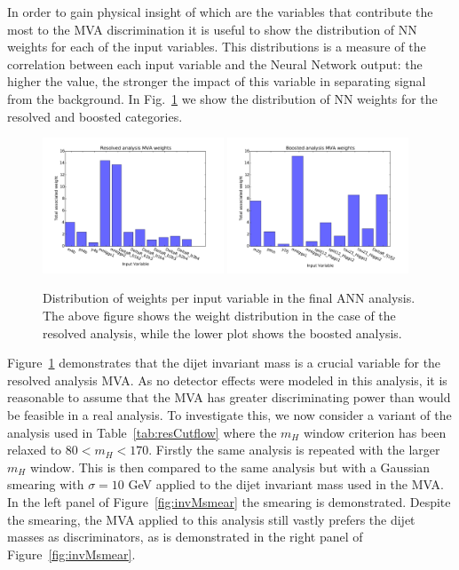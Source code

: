 In order to gain physical insight of which are the variables that
contribute the most to the MVA discrimination it is useful
to show the distribution of NN weights for each of the
input variables.
%
This distributions is a measure of the correlation between
each input variable and the Neural Network output: the higher
the value, the stronger the impact of this variable in
separating signal from the background.
%
In Fig.~\ref{fig:nnweights} we show
the distribution of NN weights for the resolved and boosted categories.

\begin{figure}[t]
\begin{center}
\includegraphics[width=0.48\textwidth]{plots/nnweights_res.pdf}
\includegraphics[width=0.48\textwidth]{plots/nnweights_boost.pdf}
\caption{\small Distribution of weights per input variable in the final ANN analysis. The above figure shows the weight distribution in the case of the resolved analysis, while the lower plot shows the boosted analysis.}
\label{fig:nnweights}
\end{center}
\end{figure}
\clearpage

Figure~\ref{fig:nnweights} demonstrates that the dijet invariant mass is a crucial variable for the resolved analysis MVA. As no detector effects were modeled in this analysis, it is reasonable to assume that the MVA has greater discriminating power than would be feasible in a real analysis. To investigate this, we now consider a variant of the analysis used in Table~\ref{tab:resCutflow} where the $m_H$ window criterion has been relaxed to $80 < m_H < 170$. Firstly the same analysis is repeated with the larger $m_H$ window. This is then compared to the same analysis but with a Gaussian smearing with $\sigma=10$ GeV applied to the dijet invariant mass used in the MVA. In the left panel of Figure~\ref{fig:invMsmear} the smearing is demonstrated. Despite the smearing, the MVA applied to this analysis still vastly prefers the dijet masses as discriminators, as is demonstrated in the right panel of Figure~\ref{fig:invMsmear}.
  

